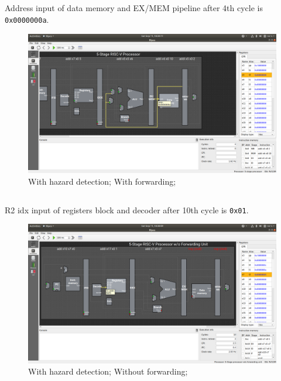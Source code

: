 \documentclass[12pt, fleqn]{article}
\begin{document}
\subsection{}
Address input of data memory and EX/MEM pipeline after 4th cycle is \verb!0x0000000a!.
\begin{figure}[H]
  \centering
  \includegraphics[scale=0.22]{Q3/hf_datapath.png}
  \caption{With hazard detection; With forwarding;}
\end{figure}

\subsection{}
R2 idx input of registers block and decoder after 10th cycle is \verb!0x01!.
\begin{figure}[H]
  \centering
  \includegraphics[scale=0.22]{Q3/hnf_datapath.png}
  \caption{With hazard detection; Without forwarding;}
\end{figure}
\end{document}
